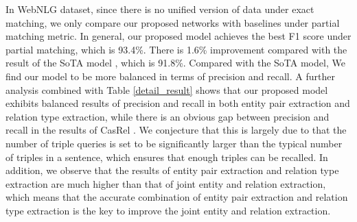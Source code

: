\documentclass[letterpaper]{article} \usepackage{aaai21}  \usepackage{times}  \usepackage{helvet} \usepackage{courier}  \usepackage[hyphens]{url}  \usepackage{graphicx} \usepackage{amsfonts,amssymb}
\begin{document}
In WebNLG dataset, since there is no unified version of data under exact matching, we only compare our proposed networks with baselines under partial matching metric. In general, our proposed model achieves the best F1 score under partial matching, which is 93.4\%. There is 1.6\% improvement compared with the result of the SoTA model \cite{wei-etal-2020-novel}, which is 91.8\%. Compared with the SoTA model, We find our model to be more balanced in terms of precision and recall. A further analysis combined with Table \ref{detail_result} shows that our proposed model exhibits balanced results of precision and recall in both entity pair extraction and relation type extraction, while there is an obvious gap between precision and recall in the results of CasRel \cite{wei-etal-2020-novel}. We conjecture that this is largely due to that the number of triple queries is set to be significantly larger than the typical number of triples in a sentence, which ensures that enough triples can be recalled. In addition, we observe that the results of entity pair extraction and relation type extraction are much higher than that of joint entity and relation extraction, which means that the accurate combination of entity pair extraction and relation type extraction is the key to improve the joint entity and relation extraction.
\begin{table}[t]
\caption{Results of ablation studies on NYT dataset.}
\label{oblation}
\end{table}
\end{document}
